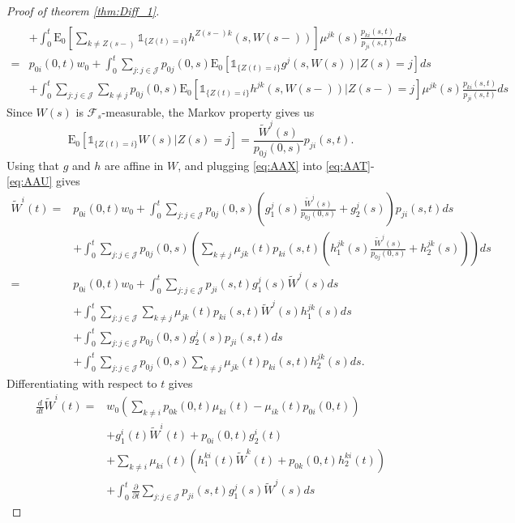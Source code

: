 \documentclass[12pt]{article}
\newcommand{\E}{\text{E}}
\newcommand{\indic}[1]{\mathds{1}_{ \{ #1 \} }}
\theoremstyle{my_thm}
\begin{document}
\begin{proof}[Proof of theorem \ref{thm:Diff_1}]
\begin{align}
\\
&+
\nonumber \int_0^t \E_0 \left[ \sum_{k \neq Z(s-)}  \indic{Z(t)=i} h^{Z(s-)k}(s,W(s-))\right] \mu^{jk}(s) \frac{p_{ki}(s,t)}{p_{ji}(s,t)}  ds
\\
=&
p_{0i}(0,t)w_0+
 \int_0^t \sum_{j:j \in \mathcal{J}} p_{0j}(0,s) \E_0 \left[ \indic{Z(t)=i} g^{j}(s,W(s))|Z(s)=j \right] ds \label{eq:AAT}
\\
&+
 \int_0^t  \sum_{j:j \in \mathcal{J}}  \sum_{k \neq j} p_{0j}(0,s) \E_0 \left[ \indic{Z(t)=i} h^{jk}(s,W(s-)) | Z(s-)=j \right] \mu^{jk}(s) \frac{p_{ki}(s,t)}{p_{ji}(s,t)}   ds \label{eq:AAU}
\end{align}
Since $W(s)$ is $\mathcal{F}_s$-measurable, the Markov property gives us
\begin{equation}
\E_0[\indic{Z(t)=i}W(s)|Z(s)=j]=\frac{\tilde{W}^j(s)}{p_{0j}(0,s)}p_{ji}(s,t). \label{eq:AAX}
\end{equation}
Using that $g$ and $h$ are affine in $W$, and plugging \eqref{eq:AAX} into \eqref{eq:AAT}-\eqref{eq:AAU} gives
\begin{align*}
\tilde{W}^i(t)=&p_{0i}(0,t)w_0+
\int_0^t \sum_{j:j \in \mathcal{J}} p_{0j}(0,s)\left(  g_1^j(s)\frac{\tilde{W}^j(s)}{p_{0j}(0,s)}+g^j_2(s)\right)p_{ji}(s,t) ds
\\
&+
\int_0^t \sum_{j:j \in \mathcal{J}} p_{0j}(0,s)  \left( \sum_{k \neq j}  \mu_{jk}(t)p_{ki}(s,t) \left(  h_1^{jk}(s) \frac{\tilde{W}^j(s)}{p_{0j}(0,s)} +h_2^{jk}(s)  \right) \right) ds
 \\
=&p_{0i}(0,t)w_0+
\int_0^t \sum_{j:j \in \mathcal{J}} p_{ji}(s,t) g_1^j(s) \tilde{W}^j(s) ds
\\
&+
\int_0^t \sum_{j:j \in \mathcal{J}} \sum_{k \neq j}  \mu_{jk}(t) p_{ki}(s,t) \tilde{W}^j(s) h^{jk}_1(s)  ds
\\
&+
\int_0^t \sum_{j:j \in \mathcal{J}} p_{0j}(0,s)g_2^j(s)p_{ji}(s,t) ds
\\
&+
\int_0^t \sum_{j:j \in \mathcal{J}} p_{0j}(0,s)  \sum_{k \neq j}  \mu_{jk}(t) p_{ki}(s,t)h^{jk}_2(s) ds.
\end{align*}
Differentiating with respect to $t$ gives
\begin{align*}
\frac{d}{dt}\tilde{W}^i(t)=&
w_0
\left(\sum_{k \neq i} p_{0k}(0,t)\mu_{ki}(t) - \mu_{ik}(t)p_{0i}(0,t)\right)
\\
&+
 g_1^i(t) \tilde{W}^i(t) +p_{0i}(0,t)g^i_2(t)\\
&+
\sum_{k \neq i} \mu_{ki}(t) \left(  h_1^{ki}(t) \tilde{W}^k(t) + p_{0k}(0,t)h^{ki}_2(t) \right)
\\
&+
\int_0^t \frac{\partial}{\partial t}  \sum_{j:j \in \mathcal{J}} p_{ji}(s,t) g_1^j(s) \tilde{W}^j(s)  ds

\end{align*}
\end{proof}
\end{document}
